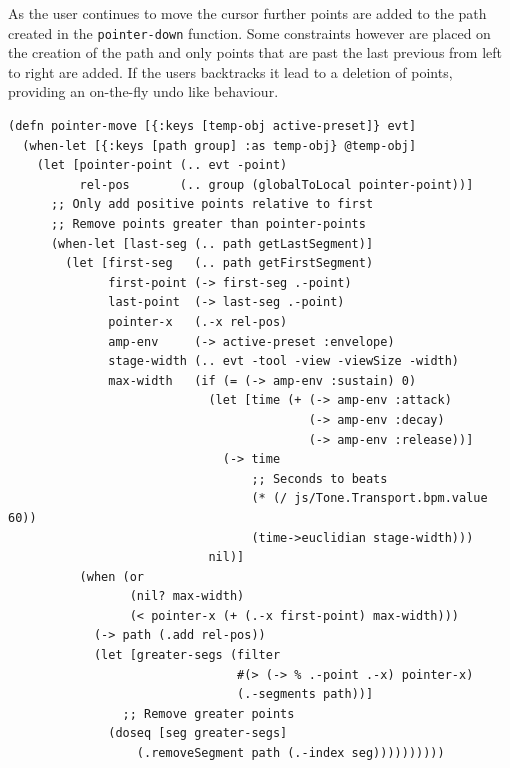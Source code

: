 \documentclass[12pt]{report}
\begin{document}
As the user continues to move the cursor further points are added to the path
created in the \texttt{pointer-down} function. Some constraints however are placed on
the creation of the path and only points that are past the last previous from
left to right are added. If the users backtracks it lead to a deletion of
points, providing an on-the-fly undo like behaviour. 
\begin{footnotesize}
\begin{verbatim}
(defn pointer-move [{:keys [temp-obj active-preset]} evt]
  (when-let [{:keys [path group] :as temp-obj} @temp-obj]
    (let [pointer-point (.. evt -point)
          rel-pos       (.. group (globalToLocal pointer-point))]
      ;; Only add positive points relative to first
      ;; Remove points greater than pointer-points
      (when-let [last-seg (.. path getLastSegment)]
        (let [first-seg   (.. path getFirstSegment)
              first-point (-> first-seg .-point)
              last-point  (-> last-seg .-point)
              pointer-x   (.-x rel-pos)
              amp-env     (-> active-preset :envelope)
              stage-width (.. evt -tool -view -viewSize -width)
              max-width   (if (= (-> amp-env :sustain) 0)
                            (let [time (+ (-> amp-env :attack)
                                          (-> amp-env :decay)
                                          (-> amp-env :release))]
                              (-> time
                                  ;; Seconds to beats
                                  (* (/ js/Tone.Transport.bpm.value 60))
                                  (time->euclidian stage-width)))
                            nil)]
          (when (or
                 (nil? max-width)
                 (< pointer-x (+ (.-x first-point) max-width)))
            (-> path (.add rel-pos))
            (let [greater-segs (filter
                                #(> (-> % .-point .-x) pointer-x)
                                (.-segments path))]
                ;; Remove greater points
              (doseq [seg greater-segs]
                  (.removeSegment path (.-index seg))))))))))
\end{verbatim}
\end{footnotesize}
\end{document}
